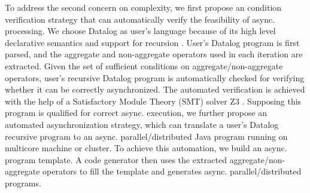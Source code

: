 
To address the second concern on complexity, we first propose an condition verification strategy that can automatically verify the feasibility of async. processing. We choose Datalog \cite{} as user's language because of its high level declarative semantics and support for recursion \cite{Shkapsky:2016:BDA:2882903.2915229}. User's Datalog program is first parsed, and the aggregate and non-aggregate operators used in each iteration are extracted. Given the set of sufficient conditions on aggregate/non-aggregate operators, user's recursive Datalog program is automatically checked for verifying whether it can be correctly asynchronized. The automated verification is achieved with the help of a Satisfactory Module Theory (SMT) solver Z3 \cite{DeMoura:2008:ZES:1792734.1792766}. Supposing this program is qualified for correct async. execution, we further propose an automated asynchronization strategy, which can translate a user's Datalog recursive program to an async. parallel/distributed Java program running on multicore machine or cluster. To achieve this automation, we build an async. program template. A code generator then uses the extracted aggregate/non-aggregate operators to fill the template and generates async. parallel/distributed programs.


